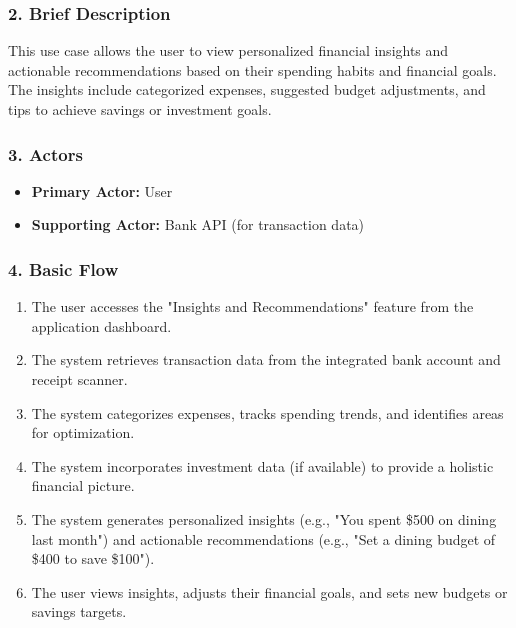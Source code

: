 \subsubsection*{2. Brief Description}
This use case allows the user to view personalized financial insights and actionable recommendations based on their spending habits and financial goals. The insights include categorized expenses, suggested budget adjustments, and tips to achieve savings or investment goals.

\subsubsection*{3. Actors}
\begin{itemize}
    \item \textbf{Primary Actor:} User
    \item \textbf{Supporting Actor:} Bank API (for transaction data)
\end{itemize}

\subsubsection*{4. Basic Flow }
\begin{enumerate}
    \item The user accesses the "Insights and Recommendations" feature from the application dashboard.
    \item The system retrieves transaction data from the integrated bank account and receipt scanner.
    \item The system categorizes expenses, tracks spending trends, and identifies areas for optimization.
    \item The system incorporates investment data (if available) to provide a holistic financial picture.
    \item The system generates personalized insights (e.g., "You spent \$500 on dining last month") and actionable recommendations (e.g., "Set a dining budget of \$400 to save \$100").
    \item The user views insights, adjusts their financial goals, and sets new budgets or savings targets.
\end{enumerate}

